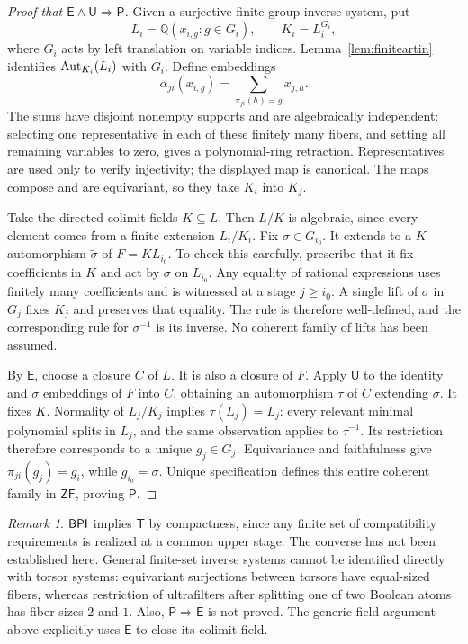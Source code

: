 \documentclass[11pt,a4paper]{article}
\theoremstyle{definition}\newtheorem{definition}[theorem]{Definition}
\theoremstyle{remark}\newtheorem{remark}[theorem]{Remark}
\newcommand{\ZF}{\mathsf{ZF}}\newcommand{\ZFA}{\mathsf{ZFA}}
\newcommand{\E}{\mathsf E}\newcommand{\U}{\mathsf U}
\newcommand{\Q}{\mathbb Q}\newcommand{\F}{\mathbb F}
\begin{document}
\begin{proof}[Proof that $\E\wedge\U\Rightarrow\mathsf P$]
Given a surjective finite-group inverse system, put
\[
L_i=\Q(x_{i,g}:g\in G_i),\qquad K_i=L_i^{G_i},
\]
where $G_i$ acts by left translation on variable indices. Lemma~\ref{lem:finiteartin} identifies $\operatorname{Aut}_{K_i}(L_i)$ with $G_i$. Define embeddings
\[
\alpha_{ji}(x_{i,g})=\sum_{\pi_{ji}(h)=g}x_{j,h}.
\]
The sums have disjoint nonempty supports and are algebraically independent: selecting one representative in each of these finitely many fibers, and setting all remaining variables to zero, gives a polynomial-ring retraction. Representatives are used only to verify injectivity; the displayed map is canonical. The maps compose and are equivariant, so they take $K_i$ into $K_j$.

Take the directed colimit fields $K\subseteq L$. Then $L/K$ is algebraic, since every element comes from a finite extension $L_i/K_i$. Fix $\sigma\in G_{i_0}$. It extends to a $K$-automorphism $\widetilde\sigma$ of $F=K L_{i_0}$. To check this carefully, prescribe that it fix coefficients in $K$ and act by $\sigma$ on $L_{i_0}$. Any equality of rational expressions uses finitely many coefficients and is witnessed at a stage $j\geq i_0$. A single lift of $\sigma$ in $G_j$ fixes $K_j$ and preserves that equality. The rule is therefore well-defined, and the corresponding rule for $\sigma^{-1}$ is its inverse. No coherent family of lifts has been assumed.

By $\E$, choose a closure $C$ of $L$. It is also a closure of $F$. Apply $\U$ to the identity and $\widetilde\sigma$ embeddings of $F$ into $C$, obtaining an automorphism $\tau$ of $C$ extending $\widetilde\sigma$. It fixes $K$. Normality of $L_j/K_j$ implies $\tau(L_j)=L_j$: every relevant minimal polynomial splits in $L_j$, and the same observation applies to $\tau^{-1}$. Its restriction therefore corresponds to a unique $g_j\in G_j$. Equivariance and faithfulness give $\pi_{ji}(g_j)=g_i$, while $g_{i_0}=\sigma$. Unique specification defines this entire coherent family in $\ZF$, proving $\mathsf P$.
\end{proof}

\begin{remark}
$\mathsf{BPI}$ implies $\mathsf T$ by compactness, since any finite set of compatibility requirements is realized at a common upper stage. The converse has not been established here. General finite-set inverse systems cannot be identified directly with torsor systems: equivariant surjections between torsors have equal-sized fibers, whereas restriction of ultrafilters after splitting one of two Boolean atoms has fiber sizes $2$ and $1$. Also, $\mathsf P\Rightarrow\E$ is not proved. The generic-field argument above explicitly uses $\E$ to close its colimit field.
\end{remark}
\end{document}
